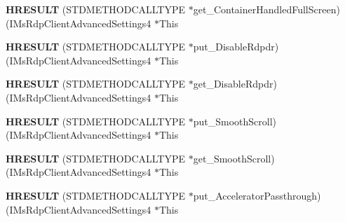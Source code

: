 \begin{DoxyCompactItemize}
\item 
\mbox{\label{struct_i_ms_rdp_client_advanced_settings4_vtbl_a48c42cf24b2544b619a684e5c01b6659}} 
{\bfseries H\+R\+E\+S\+U\+LT} (S\+T\+D\+M\+E\+T\+H\+O\+D\+C\+A\+L\+L\+T\+Y\+PE $\ast$get\+\_\+\+Container\+Handled\+Full\+Screen)(I\+Ms\+Rdp\+Client\+Advanced\+Settings4 $\ast$This
\item 
\mbox{\label{struct_i_ms_rdp_client_advanced_settings4_vtbl_ad2af3b92b5f48b10885367c6f9c8b14c}} 
{\bfseries H\+R\+E\+S\+U\+LT} (S\+T\+D\+M\+E\+T\+H\+O\+D\+C\+A\+L\+L\+T\+Y\+PE $\ast$put\+\_\+\+Disable\+Rdpdr)(I\+Ms\+Rdp\+Client\+Advanced\+Settings4 $\ast$This
\item 
\mbox{\label{struct_i_ms_rdp_client_advanced_settings4_vtbl_adb10b9d46896a6e97d8582cd351bc5a5}} 
{\bfseries H\+R\+E\+S\+U\+LT} (S\+T\+D\+M\+E\+T\+H\+O\+D\+C\+A\+L\+L\+T\+Y\+PE $\ast$get\+\_\+\+Disable\+Rdpdr)(I\+Ms\+Rdp\+Client\+Advanced\+Settings4 $\ast$This
\item 
\mbox{\label{struct_i_ms_rdp_client_advanced_settings4_vtbl_a3a1c9556a90acf7232c2c6a6c552a94a}} 
{\bfseries H\+R\+E\+S\+U\+LT} (S\+T\+D\+M\+E\+T\+H\+O\+D\+C\+A\+L\+L\+T\+Y\+PE $\ast$put\+\_\+\+Smooth\+Scroll)(I\+Ms\+Rdp\+Client\+Advanced\+Settings4 $\ast$This
\item 
\mbox{\label{struct_i_ms_rdp_client_advanced_settings4_vtbl_a8b4bd631bc213d9c01cbcee05c51b256}} 
{\bfseries H\+R\+E\+S\+U\+LT} (S\+T\+D\+M\+E\+T\+H\+O\+D\+C\+A\+L\+L\+T\+Y\+PE $\ast$get\+\_\+\+Smooth\+Scroll)(I\+Ms\+Rdp\+Client\+Advanced\+Settings4 $\ast$This
\item 
\mbox{\label{struct_i_ms_rdp_client_advanced_settings4_vtbl_a90efebd649af98e16160a5de5bcd607e}} 
{\bfseries H\+R\+E\+S\+U\+LT} (S\+T\+D\+M\+E\+T\+H\+O\+D\+C\+A\+L\+L\+T\+Y\+PE $\ast$put\+\_\+\+Accelerator\+Passthrough)(I\+Ms\+Rdp\+Client\+Advanced\+Settings4 $\ast$This
\item 
\mbox{\label{struct_i_ms_rdp_client_advanced_settings4_vtbl_a000a9c1660096461bd92debf2c5b0d8e}} 

\end{DoxyCompactItemize}
